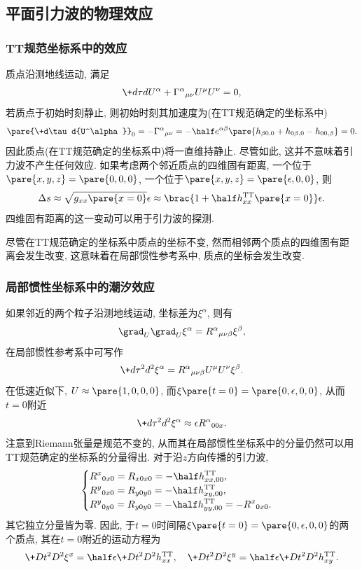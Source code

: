 \documentclass[hidelinks]{ctexart}
\begin{document}


\subsection{平面引力波的物理效应} %
\label{sub:平面引力波的物理效应}

\subsubsection{TT规范坐标系中的效应} %
\label{ssub:tt规范坐标系中的效应}

质点沿测地线运动, 满足
\[ \+d\tau d{} U^\alpha + {\Gamma^\alpha}_{\mu\nu}U^\mu U^\nu = 0, \]
若质点于初始时刻静止, 则初始时刻其加速度为(在TT规范确定的坐标系中)
\[ \pare{\+d\tau d{U^\alpha}}_0 = -{\Gamma^\alpha}_{\mu\nu} = -\half e^{\alpha\beta}\pare{h_{\beta 0,0} + h_{0\beta, 0} - h_{00,\beta}} = 0. \]
因此质点(在TT规范确定的坐标系中)将一直维持静止. 尽管如此, 这并不意味着引力波不产生任何效应. 如果考虑两个邻近质点的四维固有距离, 一个位于$\pare{x,y,z} = \pare{0,0,0}$, 一个位于$\pare{x,y,z} = \pare{\epsilon,0,0}$, 则
\[ \Delta s \approx \sqrt{g_{xx}\pare{x=0}}\epsilon \approx \brac{1 + \half h_{xx}^{\mathrm{TT}}\pare{x=0}}\epsilon. \]
四维固有距离的这一变动可以用于引力波的探测.
\par
尽管在TT规范确定的坐标系中质点的坐标不变, 然而相邻两个质点的四维固有距离会发生改变, 这意味着在局部惯性参考系中, 质点的坐标会发生改变.


\subsubsection{局部惯性坐标系中的潮汐效应} %
\label{ssub:局部惯性坐标系中的潮汐效应}

如果邻近的两个粒子沿测地线运动, 坐标差为$\xi^\alpha$, 则有\cite{carroll_2019}
\[ \grad_U \grad_U \xi^\alpha = {R^\alpha}_{\mu\nu\beta}\xi^\beta, \]
在局部惯性参考系中可写作
\[ \+d{\tau^2}d{^2}{\xi^\alpha} = {R^\alpha}_{\mu\nu\beta}U^\mu U^\nu \xi^\beta. \]
在低速近似下, $U\approx \pare{1,0,0,0}$, 而$\xi\pare{t=0} = \pare{0,\epsilon,0,0}$, 从而$t=0$附近
\[ \+d{\tau^2}d{^2}\xi^\alpha \approx \epsilon {R^\alpha}_{00x}. \]
注意到Riemann张量是规范不变的, 从而其在局部惯性坐标系中的分量仍然可以用TT规范确定的坐标系的分量得出. 对于沿$z$方向传播的引力波,
\[ \begin{cases}
    \displaystyle {R^x}_{0x0} = R_{x0x0} = -\half h_{xx,00}^{\mathrm{TT}}, \\
    \displaystyle {R^y}_{0x0} = R_{y0y0} = -\half h_{xy,00}^{\mathrm{TT}}, \\
    \displaystyle {R^y}_{0y0} = R_{y0y0} = -\half h_{yy,00}^{\mathrm{TT}} = -{R^x}_{0x0}.
\end{cases} \]
其它独立分量皆为零. 因此, 于$t=0$时间隔$\xi\pare{t=0} = \pare{0,\epsilon,0,0}$的两个质点, 其在$t=0$附近的运动方程为
\[ \+D{t^2}D{^2}\xi^x = \half \epsilon \+D{t^2}D{^2}h_{xx}^{\mathrm{TT}},\quad \+D{t^2}D{^2}\xi^y = \half \epsilon \+D{t^2}D{^2} h_{xy}^{\mathrm{TT}}. \]
\end{document}
